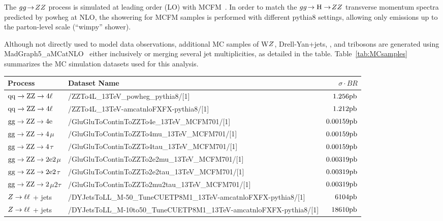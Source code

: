 The $gg \! \to \! ZZ$ process is simulated at leading order (LO) 
with MCFM~\cite{MCFM,Campbell:2013una}. In order to match the 
$gg \! \to \mathrm{H} \to \! ZZ$ transverse momentum spectra predicted 
by {\sc powheg} at NLO, the showering for MCFM samples is performed with 
different {\sc pythia8} settings, allowing only emissions up to the parton-level scale
(``wimpy'' shower).

Although not directly used to model data observations, additional 
MC samples of W$Z$, Drell-Yan+jets, \ttbar, and tribosons are
generated using {\sc MadGraph5\_aMCatNLO}~\cite{Alwall:2014hca} either
inclusively or merging several jet multiplicities, as detailed in the table.
Table~\ref{tab:MCsamples} summarizes the MC simulation datasets used for this analysis. 

\begin{table}
\begin{footnotesize}
    \centering
    \begin{tabular}{|l|l|r|}
   \hline
 Process & Dataset Name & $\sigma\cdot BR$ \\ \hline
 $\rm{qq} \to ZZ \to 4\ell$ & /ZZTo4L\_13TeV\_powheg\_pythia8/[1] & $1.256 \rm{pb}$ \\
 $\rm{qq} \to ZZ \to 4\ell$ & /ZZTo4L\_13TeV-amcatnloFXFX-pythia8/[1] & $1.212 \rm{pb}$ \\
 $\rm{gg} \rightarrow ZZ \to 4e$ & /GluGluToContinToZZTo4e\_13TeV\_MCFM701/[1] & $0.00159 \rm{ pb}$ \\
 $\rm{gg} \rightarrow ZZ \to 4$$\mu$ & /GluGluToContinToZZTo4mu\_13TeV\_MCFM701/[1] & $0.00159 \rm{ pb}$ \\
 $\rm{gg} \rightarrow ZZ \to 4$$\tau$ & /GluGluToContinToZZTo4tau\_13TeV\_MCFM701/[1] & $0.00159 \rm{ pb}$ \\
 $\rm{gg} \rightarrow ZZ \to 2e2$$\mu$ & /GluGluToContinToZZTo2e2mu\_13TeV\_MCFM701/[1] & $0.00319 \rm{ pb}$ \\
 $\rm{gg} \rightarrow ZZ \to 2e2$$\tau$ & /GluGluToContinToZZTo2e2tau\_13TeV\_MCFM701/[1] & $0.00319 \rm{ pb}$ \\
 $\rm{gg} \rightarrow ZZ \to 2$$\mu2$$\tau$ & /GluGluToContinToZZTo2mu2tau\_13TeV\_MCFM701/[1] & $0.00319 \rm{ pb}$ \\ \hline
 $Z \to \ell\ell$ + jets & /DYJetsToLL\_M-50\_TuneCUETP8M1\_13TeV-amcatnloFXFX-pythia8/[1] & $6104 \rm{ pb}$ \\
 $Z \to \ell\ell$ + jets  & /DYJetsToLL\_M-10to50\_TuneCUETP8M1\_13TeV-amcatnloFXFX-pythia8/[1] & $18610 \rm{ pb}$ \\ \hline

\end{tabular}
\end{footnotesize}
\end{table}
